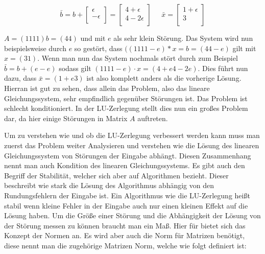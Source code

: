 \documentclass[course=erap]{aspdoc}
\begin{document}
\begin{equation}
\label{absBeis2}
\bar{b} = b + 
 \begin{bmatrix}
 \epsilon \\
 -\epsilon\\
 \end{bmatrix}
 = \begin{bmatrix}
 4 + \epsilon\\
 4- 2\epsilon\\
 \end{bmatrix}
  \;\;\;\;\;
  \bar{x} = 
  \begin{bmatrix}
 1 + \epsilon \\
 3\\
\end{bmatrix}
\end{equation}

 $A = (1 1 1 1) b = (4 4)$ und mit $e$ als sehr klein Störung. Das System wird                    %
nun beispielsweise durch $e$ so gestört, dass $((1 1 1 1-e)*x = b = (4 4-e)$ gilt mit$ x = (3 1)$. 
Wenn man nun das System nochmals stört durch zum Beispiel $\bar{b} = b + (e -e)$ sodass 
gilt $(1 1 1 1-e) \cdot x = (4+e 4-2e)$. Dies führt nun dazu, dass $\bar{x} = ( 1+e 3)$ ist also komplett 
anders als die vorherige Lösung.
Hierran ist gut zu sehen, dass allein das Problem, also 
das lineare Gleichungssystem, sehr empfindlich gegenüber Störungen ist.
Das Problem ist schlecht konditioniert. In der LU-Zerlegung stellt dies nun ein großes 
Problem dar, da hier einige Störungen in Matrix $A$ auftreten.

Um zu verstehen wie und ob die LU-Zerlegung verbessert werden kann muss man 
zuerst das Problem weiter Analysieren und verstehen wie die Lösung des linearen 
Gleichungssystem von Störungen der Eingabe abhängt. Diesen Zusammenhang nennt 
man auch Kondition des linearen Gleichungssystems. Es gibt auch den Begriff der 								%
Stabilität, welcher sich aber auf Algorithmen bezieht. Dieser beschreibt wie stark die 
Lösung des Algorithmus abhängig von den Rundungsfehlern der Eingabe ist. Ein Algorithmus wie die LU-Zerlegung heißt stabil wenn 
kleine Fehler in der Eingabe auch nur einen kleinen Effekt auf die Lösung haben.
Um die Größe einer Störung und die Abhängigkeit der Lösung von der Störung messen zu 
können braucht man ein Maß. Hier für bietet sich das Konzept der Normen an. Es wird aber 
auch die Norm für Matrizen benötigt, diese nennt man die zugehörige Matrizen Norm, 
welche wie folgt definiert ist: \\
\end{document}
